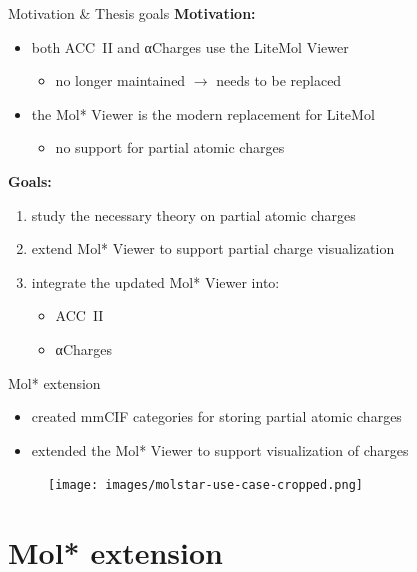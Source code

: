\documentclass[
]{beamer}
\begin{document}
\begin{frame}{Motivation \& Thesis goals}
  \textbf{Motivation:}
  \begin{itemize}
    \item both ACC~II and αCharges use the LiteMol Viewer
    \begin{itemize}
      \item no longer maintained $\rightarrow$ needs to be replaced
    \end{itemize}
    \item the Mol* Viewer is the modern replacement for LiteMol
    \begin{itemize}
      \item no support for partial atomic charges
    \end{itemize}
  \end{itemize}
  \vspace{10pt}
  \textbf{Goals:}
  \begin{enumerate}
    \item study the necessary theory on partial atomic charges
    \item extend Mol* Viewer to support partial charge visualization
    \item integrate the updated Mol* Viewer into:
    \begin{itemize}
      \item ACC~II
      \item αCharges
    \end{itemize}
  \end{enumerate}
\end{frame}
    
\begin{frame}{Mol* extension}
  \begin{itemize}
    \item created mmCIF categories for storing partial atomic charges
    \item extended the Mol* Viewer to support visualization of charges
  \end{itemize}
  \begin{figure}
    \texttt{[image: images/molstar-use-case-cropped.png]}
  \end{figure}
\end{frame}

\section{Mol* extension}
\end{document}
